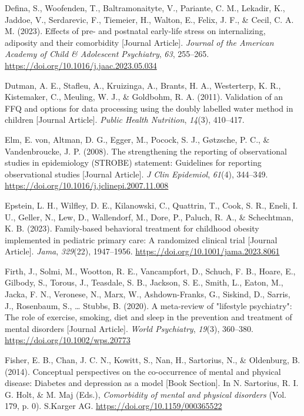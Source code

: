 \documentclass[
  letterpaper,
  DIV=11,
  numbers=noendperiod]{scrreport}
\newlength{\cslhangindent}
\newenvironment{CSLReferences}[2] %
 {\begin{list}{}{%
  \setlength{\itemindent}{0pt}
  \setlength{\leftmargin}{0pt}
  \setlength{\parsep}{0pt}
  \ifodd #1
   \setlength{\leftmargin}{\cslhangindent}
   \setlength{\itemindent}{-1\cslhangindent}
  \fi
  \setlength{\itemsep}{#2\baselineskip}}}
 {\end{list}}
\begin{document}
\begin{CSLReferences}{1}{0}
Defina, S., Woofenden, T., Baltramonaityte, V., Pariante, C. M.,
Lekadir, K., Jaddoe, V., Serdarevic, F., Tiemeier, H., Walton, E.,
Felix, J. F., \& Cecil, C. A. M. (2023). Effects of pre- and postnatal
early-life stress on internalizing, adiposity and their comorbidity
{[}Journal Article{]}. \emph{Journal of the American Academy of Child \&
Adolescent Psychiatry}, \emph{63}, 255--265.
\url{https://doi.org/10.1016/j.jaac.2023.05.034}

Dutman, A. E., Stafleu, A., Kruizinga, A., Brants, H. A., Westerterp, K.
R., Kistemaker, C., Meuling, W. J., \& Goldbohm, R. A. (2011).
Validation of an FFQ and options for data processing using the doubly
labelled water method in children {[}Journal Article{]}. \emph{Public
Health Nutrition}, \emph{14}(3), 410--417.

Elm, E. von, Altman, D. G., Egger, M., Pocock, S. J., Gøtzsche, P. C.,
\& Vandenbroucke, J. P. (2008). The strengthening the reporting of
observational studies in epidemiology (STROBE) statement: Guidelines for
reporting observational studies {[}Journal Article{]}. \emph{J Clin
Epidemiol}, \emph{61}(4), 344--349.
\url{https://doi.org/10.1016/j.jclinepi.2007.11.008}

Epstein, L. H., Wilfley, D. E., Kilanowski, C., Quattrin, T., Cook, S.
R., Eneli, I. U., Geller, N., Lew, D., Wallendorf, M., Dore, P., Paluch,
R. A., \& Schechtman, K. B. (2023). Family-based behavioral treatment
for childhood obesity implemented in pediatric primary care: A
randomized clinical trial {[}Journal Article{]}. \emph{Jama},
\emph{329}(22), 1947--1956. \url{https://doi.org/10.1001/jama.2023.8061}

Firth, J., Solmi, M., Wootton, R. E., Vancampfort, D., Schuch, F. B.,
Hoare, E., Gilbody, S., Torous, J., Teasdale, S. B., Jackson, S. E.,
Smith, L., Eaton, M., Jacka, F. N., Veronese, N., Marx, W.,
Ashdown-Franks, G., Siskind, D., Sarris, J., Rosenbaum, S., \ldots{}
Stubbs, B. (2020). A meta-review of "lifestyle psychiatry": The role of
exercise, smoking, diet and sleep in the prevention and treatment of
mental disorders {[}Journal Article{]}. \emph{World Psychiatry},
\emph{19}(3), 360--380. \url{https://doi.org/10.1002/wps.20773}

Fisher, E. B., Chan, J. C. N., Kowitt, S., Nan, H., Sartorius, N., \&
Oldenburg, B. (2014). Conceptual perspectives on the co-occurrence of
mental and physical disease: Diabetes and depression as a model {[}Book
Section{]}. In N. Sartorius, R. I. G. Holt, \& M. Maj (Eds.),
\emph{Comorbidity of mental and physical disorders} (Vol. 179, p. 0).
S.Karger AG. \url{https://doi.org/10.1159/000365522}


\end{CSLReferences}
\end{document}
